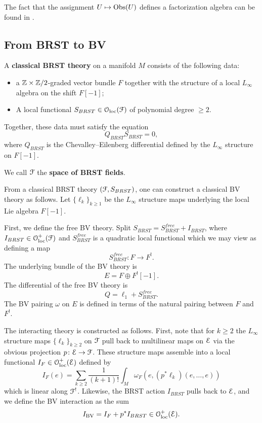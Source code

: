\documentclass[10pt, oneside]{article}
\begin{document}
The fact that the assignment $U \mapsto \mathrm{Obs}(U)$ defines a factorization algebra can be found in \cite[Section 3]{Book2}. 

\subsection{From BRST to BV}

\begin{definition}
A {\bf classical BRST theory} on a manifold $M$ consists of the following data:
\begin{itemize}
\item a $\mathbb Z\times\mathbb Z/2$-graded vector bundle $F$ together with the structure of a local $L_\infty$ algebra on the shift $F[-1]$;
\item A local functional $S_{BRST} \in \mathcal{O}_{\rm loc}(\mathcal F)$ of polynomial degree $\geq 2$.
\end{itemize}
Together, these data must satisfy the equation
\[Q_{BRST} S_{BRST} = 0,\]
where $Q_{BRST}$ is the Chevalley--Eilenberg differential defined by the $L_\infty$ structure on $F[-1]$. 
\end{definition}

We call $\mathcal F$ the {\bf space of BRST fields}.

From a classical BRST theory $(\mathcal F, S_{BRST})$, one can construct a classical BV theory as follows. Let $\{\ell_k\}_{k\geq 1}$ be the $L_\infty$ structure maps underlying the local Lie algebra $F[-1]$.

First, we define the free BV theory. Split $S_{BRST} = S^{free}_{BRST} + I_{BRST}$, where $I_{BRST}\in\mathcal{O}_{\rm loc}^+(\mathcal F)$ and $S^{free}_{BRST}$ is a quadratic local functional which we may view as defining a map
\[S^{free}_{BRST}\colon F\rightarrow F^!.\]
The underlying bundle of the BV theory is
\[
E = F \oplus F^! [-1].
\]
The differential of the free BV theory is
\[
Q = \ell_1 + S^{free}_{BRST}.
\]
The BV pairing $\omega$ on $E$ is defined in terms of the natural pairing between $F$ and $F^!$.

The interacting theory is constructed as follows. First, note that for $k \geq 2$ the $L_\infty$ structure maps $\{\ell_k\}_{k \geq 2}$ on $\mathcal F$ pull back to multilinear maps on $\mathcal E$ via the obvious projection $p\colon \mathcal E\rightarrow \mathcal F$. These structure maps assemble into a local functional $I_F \in \mathcal{O}_{\rm loc}^+(\mathcal E)$ defined by
\[
I_F (e) = \sum_{k \geq 2} \frac{1}{(k+1)!} \int_M \omega_F(e, (p^*\ell_k) (e, \ldots, e))
\] 
which is linear along $\mathcal F^!$. Likewise, the BRST action $I_{BRST}$ pulls back to $\mathcal E$, and we define the BV interaction as the sum
\[
I_{\mathrm{BV}} = I_{F} + p^* I_{BRST} \in \mathcal{O}_{\rm loc}^+(\mathcal E) .
\]
\end{document}
